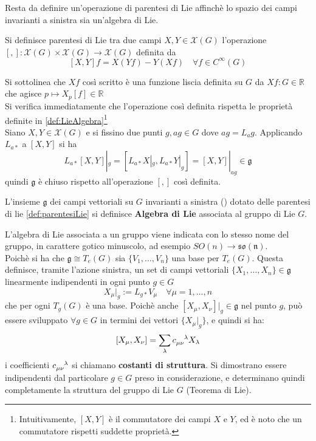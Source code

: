 Resta da definire un'operazione di parentesi di Lie affinchè lo spazio dei campi
invarianti a sinistra sia un'algebra di Lie.\\
\begin{definition}\label{def:parentesiLie}
   Si definisce parentesi di Lie tra due campi $X,Y \in \mathcal{X}(G)$ l'operazione
   $[,] : \mathcal{X}(G) \times \mathcal{X}(G) \to \mathcal{X}(G)$ definita da
   $$
      [X,Y]f = X(Yf) - Y(Xf) \quad \forall f \in C^\infty(G)
   $$
\end{definition}
Si sottolinea che $Xf$ così scritto è una funzione liscia definita su $G$ da
$Xf : G \in \mathbb{R}$ che agisce $p \mapsto X_p[f]\in \mathbb{R}$\\

Si verifica immediatamente che l'operazione così definita rispetta le proprietà
definite in \ref{def:LieAlgebra}\footnote{Intuitivamente, $[X,Y]$ è il commutatore
dei campi $X$ e $Y$, ed è noto che un commutatore rispetti suddette proprietà.}\\

Siano $X,Y \in \mathcal{X}(G)$ e si fissino due punti $g, ag \in G$ dove
$ag = L_a g$. Applicando $L_{a*}$ a $[X,Y]$ si ha
$$
   L_{a*}[X,Y]|_g = [L_{a*}X|_g,L_{a*}Y|_g] = [X,Y]|_{ag} \in \mathfrak{g}
$$
quindi $\mathfrak{g}$ è chiuso rispetto all'operazione $[,]$ così definita.\\

\begin{definition}\label{}
   L'insieme $\mathfrak{g}$ dei campi vettoriali su $G$ invarianti a sinistra ()
   dotato delle parentesi di lie \ref{def:parentesiLie} si definisce
   \textbf{Algebra di Lie} associata al gruppo di Lie $G$.
\end{definition}
L'algebra di Lie associata a un gruppo viene indicata con lo stesso nome del gruppo,
in carattere gotico minuscolo, ad esempio $SO(n)\to \mathfrak{so(n)}$.\\

Poichè si ha che $\mathfrak{g} \cong T_e(G)$ sia $\{ V_1,\dots,V_n \}$ una base
per $T_e(G)$. Questa definisce, tramite l'azione sinistra, un set di campi vettoriali
$\{ X_1, \dots, X_n \} \in \mathfrak{g}$ linearmente indipendenti in ogni punto $g \in G$
$$
   X_\mu |_g := L_{g*}V_\mu \quad \forall \mu = 1,\dots,n
$$
che per ogni $T_g(G)$ è una base. Poichè anche $[X_\mu,X_\nu]|_g \in \mathfrak{g}$
nel punto $g$, può essere sviluppato $ \forall g \in G$ in termini dei vettori
$\{X_\mu|_g\}$, e quindi si ha:
$$
   [X_\mu,X_\nu] = \sum_\lambda c_{\mu\nu}^{\hphantom{\mu\nu}\lambda} X_\lambda
$$
i coefficienti $c_{\mu\nu}^{\hphantom{\mu\nu}\lambda}$ si chiamano
\textbf{costanti di struttura}.
Si dimostrano essere indipendenti dal particolare $g \in G$ preso in considerazione,
e determinano quindi completamente la struttura del gruppo di Lie $G$ (Teorema di Lie).\\

